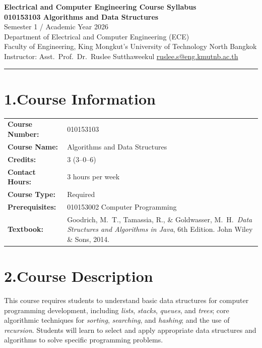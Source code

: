 \documentclass[11pt,a4paper]{article}
\newcommand{\fieldlabel}[1]{\textbf{#1:}}
\begin{document}
\begin{center}
  {\Large\bfseries\color{kmutnbBlue}
    Electrical and Computer Engineering Course Syllabus}\\[4pt]
  {\large\bfseries 010153103 \quad Algorithms and Data Structures}\\[2pt]
  {\normalsize Semester 1 / Academic Year 2026}\\[2pt]
  {\small Department of Electrical and Computer Engineering (ECE)}\\
  {\small Faculty of Engineering,
    King Mongkut's University of Technology North Bangkok}\\[4pt]
  {\small Instructor: Asst.\ Prof.\ Dr.\ Ruslee Sutthaweekul
    \quad\textbar\quad
    \href{mailto:ruslee.s@eng.kmutnb.ac.th}{ruslee.s@eng.kmutnb.ac.th}}
\end{center}

\noindent\rule{\linewidth}{0.4pt}\medskip

\section*{1.\quad Course Information}
\begin{tabular}{@{}p{4.4cm}p{10.8cm}@{}}
  \fieldlabel{Course Number}   & 010153103 \\[2pt]
  \fieldlabel{Course Name}     & Algorithms and Data Structures \\[2pt]
  \fieldlabel{Credits}         & 3 (3--0--6) \\[2pt]
  \fieldlabel{Contact Hours}   & 3 hours per week \\[2pt]
  \fieldlabel{Course Type}     & Required \\[2pt]
  \fieldlabel{Prerequisites}   & 010153002 Computer Programming \\[2pt]
  \fieldlabel{Textbook}        & Goodrich, M.~T., Tamassia, R., \& Goldwasser, M.~H.\
                                  \textit{Data Structures and Algorithms in Java},
                                  6th Edition. John Wiley \& Sons, 2014. \\
\end{tabular}

\section*{2.\quad Course Description}
This course requires students to understand basic data structures for computer
programming development, including \emph{lists}, \emph{stacks}, \emph{queues},
and \emph{trees}; core algorithmic techniques for \emph{sorting},
\emph{searching}, and \emph{hashing}; and the use of \emph{recursion}.
Students will learn to select and apply appropriate data structures and
algorithms to solve specific programming problems.
\end{document}
